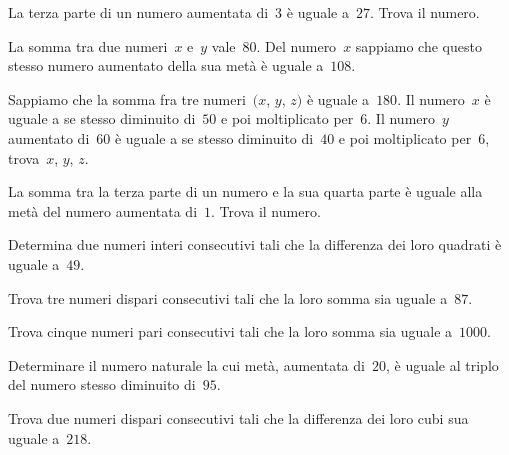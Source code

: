 \begin{multicols}{2}
\begin{esercizio}[\Ast]
\label{ese:16.20}
La terza parte di un numero aumentata di~$3$ è uguale a~$27$. Trova il numero.
\end{esercizio}

\begin{esercizio}[\Ast]
\label{ese:16.21}
La somma tra due numeri~$x$ e~$y$ vale~$80$. Del numero~$x$ sappiamo che questo stesso numero aumentato della sua metà è uguale a~$108$.
\end{esercizio}

\begin{esercizio}[\Ast]
\label{ese:16.22}
Sappiamo che la somma fra tre numeri~$(x$, $y$, $z)$ è uguale a~$180$. Il numero~$x$ è uguale a se stesso diminuito di~$50$ e poi moltiplicato per~$6$. 
Il numero~$y$ aumentato di~$60$ è uguale a se stesso diminuito di~$40$ e poi moltiplicato per~$6$, trova~$x$, $y$, $z$.
\end{esercizio}

\begin{esercizio}[\Ast]
\label{ese:16.23}
La somma tra la terza parte di un numero e la sua quarta parte è uguale alla metà del numero aumentata di~$1$. Trova il numero.
\end{esercizio}

\begin{esercizio}
\label{ese:16.24}
Determina due numeri interi consecutivi tali che la differenza dei loro quadrati è uguale a~$49$.
\end{esercizio}

\begin{esercizio}
\label{ese:16.25}
Trova tre numeri dispari consecutivi tali che la loro somma sia uguale a~$87$.
\end{esercizio}

\begin{esercizio}
\label{ese:16.26}
Trova cinque numeri pari consecutivi tali che la loro somma sia uguale a~$1000$.
\end{esercizio}

\begin{esercizio}[\Ast]
\label{ese:16.27}
Determinare il numero naturale la cui metà, aumentata di~$20$, è uguale al triplo del numero stesso diminuito di~$95$.
\end{esercizio}

\begin{esercizio}[\Ast]
\label{ese:16.28}
Trova due numeri dispari consecutivi tali che la differenza dei loro cubi sua uguale a~$218$.
\end{esercizio}


\end{multicols}
